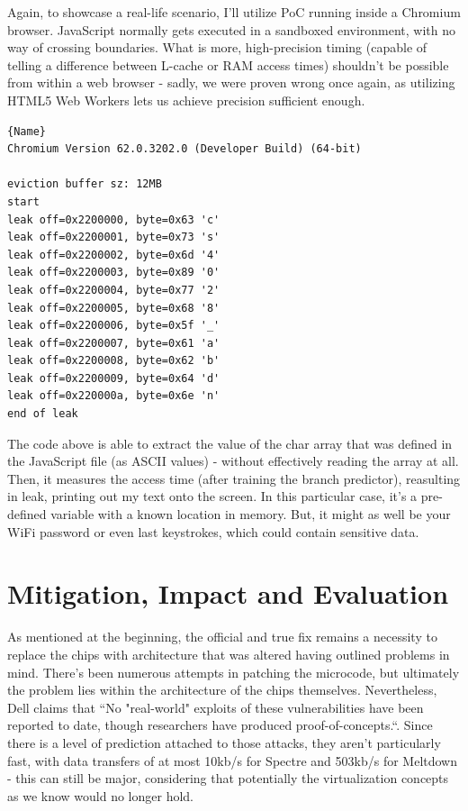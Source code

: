 \documentclass{article}
\begin{document}
Again, to showcase a real-life scenario, I'll utilize PoC running inside a Chromium browser. JavaScript normally gets executed in a sandboxed environment, with no way of crossing boundaries. What is more, high-precision timing (capable of telling a difference between L-cache or RAM access times) shouldn't be possible from within a web browser - sadly, we were proven wrong once again, as utilizing HTML5 Web Workers lets us achieve precision sufficient enough. 
\begin{lstlisting}[caption=Javascript leaking memory\cite{spectrechrome},frame=tlrb]{Name}
Chromium Version 62.0.3202.0 (Developer Build) (64-bit)

eviction buffer sz: 12MB
start
leak off=0x2200000, byte=0x63 'c'
leak off=0x2200001, byte=0x73 's'
leak off=0x2200002, byte=0x6d '4'
leak off=0x2200003, byte=0x89 '0'
leak off=0x2200004, byte=0x77 '2'
leak off=0x2200005, byte=0x68 '8' 
leak off=0x2200006, byte=0x5f '_'
leak off=0x2200007, byte=0x61 'a'
leak off=0x2200008, byte=0x62 'b'
leak off=0x2200009, byte=0x64 'd'
leak off=0x220000a, byte=0x6e 'n'
end of leak
\end{lstlisting}
The code above is able to extract the value of the char array that was defined in the JavaScript file (as ASCII values) - without effectively reading the array at all. Then, it measures the access time (after training the branch predictor), reasulting in leak, printing out my text onto the screen. In this particular case, it's a pre-defined variable with a known location in memory. But, it might as well be your WiFi password or even last keystrokes, which could contain sensitive data. 

\section{Mitigation, Impact and Evaluation}
As mentioned at the beginning, the official and true fix remains a necessity to replace the chips with architecture that was altered having outlined problems in mind. There's been numerous attempts in patching the microcode, but ultimately the problem lies within the architecture of the chips themselves. Nevertheless, Dell claims that ``No "real-world" exploits of these vulnerabilities have been reported to date, though researchers have produced proof-of-concepts.``\cite{dell}. Since there is a level of prediction attached to those attacks, they aren't particularly fast, with data transfers of at most 10kb/s for Spectre and 503kb/s for Meltdown \cite{kocher2018spectre}\cite{lipp2018meltdown} - this can still be major, considering that potentially the virtualization concepts as we know would no longer hold.
\end{document}

